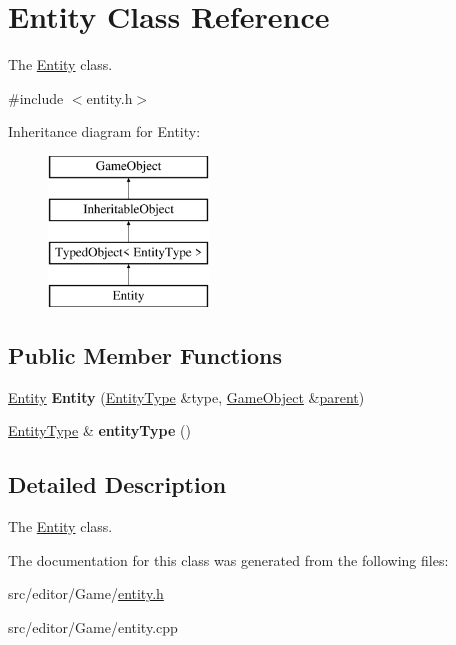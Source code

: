 \hypertarget{class_entity}{\section{\-Entity \-Class \-Reference}
\label{class_entity}
}


\-The \hyperlink{class_entity}{\-Entity} class.  




{\ttfamily \#include $<$entity.\-h$>$}

\-Inheritance diagram for \-Entity\-:\begin{figure}[H]
\begin{center}
\leavevmode
\includegraphics[height=4.000000cm]{class_entity}
\end{center}
\end{figure}
\subsection*{\-Public \-Member \-Functions}
\begin{DoxyCompactItemize}
\item 
\hypertarget{class_entity_a222731d5100c063a12557d754527bce0}{\hyperlink{class_entity}{\-Entity} {\bfseries \-Entity} (\hyperlink{class_entity_type}{\-Entity\-Type} \&type, \hyperlink{class_game_object}{\-Game\-Object} \&\hyperlink{class_game_object_af3deaf39cde23c189765634e32e95bb4}{parent})}\label{class_entity_a222731d5100c063a12557d754527bce0}

\item 
\hypertarget{class_entity_a105ed9dc813fc207677837ca59ba1037}{\hyperlink{class_entity_type}{\-Entity\-Type} \& {\bfseries entity\-Type} ()}\label{class_entity_a105ed9dc813fc207677837ca59ba1037}

\end{DoxyCompactItemize}


\subsection{\-Detailed \-Description}
\-The \hyperlink{class_entity}{\-Entity} class. 

\-The documentation for this class was generated from the following files\-:\begin{DoxyCompactItemize}
\item 
src/editor/\-Game/\hyperlink{entity_8h}{entity.\-h}\item 
src/editor/\-Game/entity.\-cpp\end{DoxyCompactItemize}
